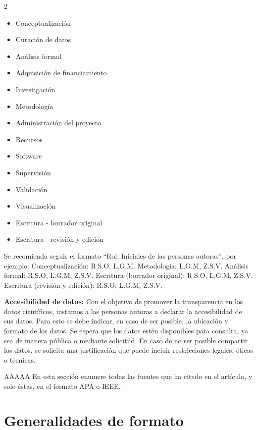 \documentclass[fleqn]{Paquetes/RevDigMatEduInt}
\begin{document}
\begin{multicols}{2}
\begin{itemize}
\item Conceptualización
\item Curación de datos
\item Análisis formal
\item Adquisición de financiamiento
\item Investigación
\item Metodología
\item Administración del proyecto
\item Recursos
\item Software
\item Supervisión
\item Validación
\item Visualización
\item Escritura - borrador original
\item Escritura - revisión y edición
\end{itemize}
\end{multicols}

Se recomienda seguir el formato ``Rol: Iniciales de las personas autoras'', por ejemplo: Conceptualización: R.S.O, L.G.M. Metodología: L.G.M, Z.S.V. Análisis formal: R.S.O, L.G.M, Z.S.V. Escritura (borrador original): R.S.O, L.G.M, Z.S.V. Escritura (revisión y edición): R.S.O, L.G.M, Z.S.V.


{\bf \color{azulTitulos}Accesibilidad de datos:}
Con el objetivo de promover la transparencia en los datos científicos, instamos a las personas autoras a declarar la accesibilidad de sus datos. Para esto se debe indicar, en caso de ser posible, la ubicación y formato de los datos. Se espera que los datos estén disponibles para consulta, ya sea de manera pública o mediante solicitud. En caso de no ser posible compartir los datos, se solicita una justificación que puede incluir restricciones legales, éticas o técnicas. 


\begin{thebibliography}{AAAAA}
	 En esta sección enumere todas las fuentes que ha citado en el artículo, y solo éstas, en el formato APA o IEEE.
\end{thebibliography}

\newpage
\section{Generalidades de formato}
\end{document}
